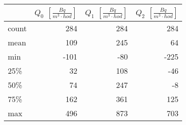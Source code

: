 \begin{tabular}{lrrr}
\toprule
{} &  $Q_0$ $\left[\si{\frac{Bq}{m^3\cdot hod}}\right]$ &  $Q_1$ $\left[\si{\frac{Bq}{m^3\cdot hod}}\right]$ &  $Q_2$ $\left[\si{\frac{Bq}{m^3\cdot hod}}\right]$ \\
\midrule
count &                                                284 &                                                284 &                                                284 \\
mean  &                                                109 &                                                245 &                                                 64 \\
min   &                                               -101 &                                                -80 &                                               -225 \\
25\%   &                                                 32 &                                                108 &                                                -46 \\
50\%   &                                                 74 &                                                247 &                                                 -8 \\
75\%   &                                                162 &                                                361 &                                                125 \\
max   &                                                496 &                                                873 &                                                703 \\
\bottomrule
\end{tabular}
